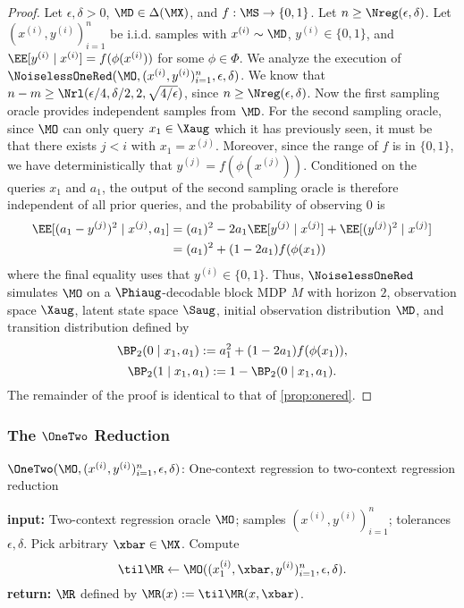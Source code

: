 \begin{proof}
Let $\epsilon,\delta>0$, $\MD \in \Delta(\MX)$, and $f: \MS \to \{0,1\}$. Let $n \geq \Nreg(\epsilon,\delta)$. Let $(x^{(i)},y^{(i)})_{i=1}^n$ be i.i.d. samples with $x^{(i)} \sim \MD$, $y^{(i)} \in \{0,1\}$, and $\EE[y^{(i)}\mid{}x^{(i)}] = f(\phi(x^{(i)}))$ for some $\phi \in \Phi$. We analyze the execution of $\NoiselessOneRed(\MO,(x^{(i)},y^{(i)})_{i=1}^n, \epsilon,\delta)$. We know that $n-m \geq \Nrl(\epsilon/4,\delta/2,2,\sqrt{4/\epsilon})$, since $n \geq \Nreg(\epsilon,\delta)$. Now the first sampling oracle provides independent samples from $\MD$. For the second sampling oracle, since $\MO$ can only query $x_1 \in \Xaug$ which it has previously seen, it must be that there exists $j < i$ with $x_1 = x^{(j)}$. Moreover, since the range of $f$ is in $\{0,1\}$, we have deterministically that $y^{(j)} = f(\phi(x^{(j)}))$. Conditioned on the queries $x_1$ and $a_1$, the output of the second sampling oracle is therefore independent of all prior queries, and the probability of observing $0$ is
\begin{align*}
\EE[(a_1-y^{(j)})^2\mid{} x^{(j)}, a_1]
&= (a_1)^2 - 2 a_1 \EE[y^{(j)}\mid{} x^{(j)}] + \EE[(y^{(j)})^2 \mid{} x^{(j)}] \\ 
&= (a_1)^2 + (1 - 2a_1) f(\phi(x_1))
\end{align*}
where the final equality uses that $y^{(i)} \in \{0,1\}$. Thus, $\NoiselessOneRed$ simulates $\MO$ on a $\Phiaug$-decodable block MDP $M$ with horizon $2$, observation space $\Xaug$, latent state space $\Saug$, initial observation distribution $\MD$, and transition distribution defined by
\[\BP_2(0\mid{} x_1,a_1) := a_1^2 + (1-2a_1)f(\phi(x_1)),\]
\[\BP_2(1\mid{} x_1,a_1) := 1 - \BP_2(0\mid{} x_1,a_1).\]
The remainder of the proof is identical to that of \cref{prop:onered}.
\end{proof}

\subsubsection{The $\OneTwo$ Reduction}\label{sec:onetwo}

\begin{algorithm}[t]
	\caption{$\OneTwo(\MO, (x^{(i)},y^{(i)})_{i=1}^n,\epsilon,\delta)$: One-context regression to two-context regression reduction}
	\label{alg:onetwo}
	\begin{algorithmic}[1]\onehalfspacing
		          \State \textbf{input:} Two-context regression oracle $\MO$; samples $(x^{(i)},y^{(i)})_{i=1}^n$; tolerances $\epsilon,\delta$.
		\State Pick arbitrary $\xbar \in \MX$.
        \State Compute
        \[\til \MR \gets \MO((x_1^{(i)},\xbar, y^{(i)})_{i=1}^{n},\epsilon, \delta).\]\label{line:tilmr}
        \State \textbf{return:} $\MR$ defined by $\MR(x) := \til\MR(x,\xbar)$.
	\end{algorithmic}
\end{algorithm}

